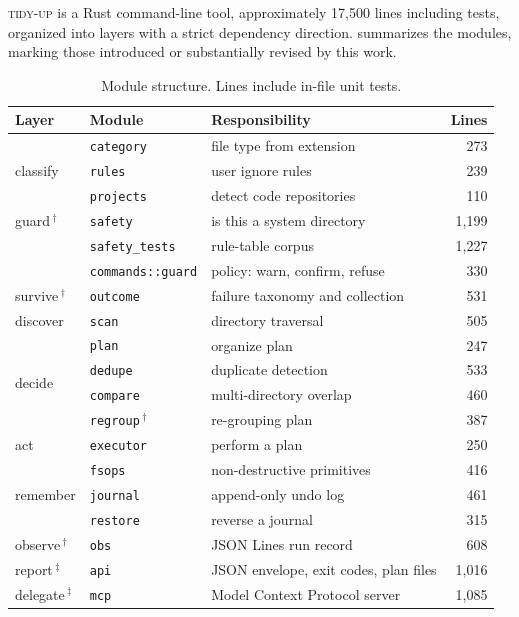 \documentclass[11pt,a4paper]{article}
\newcommand{\code}[1]{\texttt{\small #1}}
\newcommand{\tool}{\textsc{tidy-up}}
\begin{document}
\tool{} is a Rust command-line tool, approximately 17{,}500 lines including tests,
organized into layers with a strict dependency direction. 
summarizes the modules, marking those introduced or substantially revised by this
work.

\begin{table}[t]
\centering
\small
\caption{Module structure. Lines include in-file unit tests.}
\label{tab:modules}
\begin{tabularx}{\textwidth}{@{}l l X r@{}}
\toprule
\textbf{Layer} & \textbf{Module} & \textbf{Responsibility} & \textbf{Lines} \\
\midrule
\multirow{3}{*}{classify} & \code{category} & file type from extension & 273 \\
 & \code{rules} & user ignore rules & 239 \\
 & \code{projects} & detect code repositories & 110 \\
\midrule
guard\,$^\dagger$ & \code{safety} & is this a system directory & 1{,}199 \\
 & \code{safety\_tests} & rule-table corpus & 1{,}227 \\
 & \code{commands::guard} & policy: warn, confirm, refuse & 330 \\
\midrule
survive\,$^\dagger$ & \code{outcome} & failure taxonomy and collection & 531 \\
\midrule
discover & \code{scan} & directory traversal & 505 \\
\midrule
\multirow{4}{*}{decide} & \code{plan} & organize plan & 247 \\
 & \code{dedupe} & duplicate detection & 533 \\
 & \code{compare} & multi-directory overlap & 460 \\
 & \code{regroup}\,$^\dagger$ & re-grouping plan & 387 \\
\midrule
act & \code{executor} & perform a plan & 250 \\
 & \code{fsops} & non-destructive primitives & 416 \\
\midrule
remember & \code{journal} & append-only undo log & 461 \\
 & \code{restore} & reverse a journal & 315 \\
\midrule
observe\,$^\dagger$ & \code{obs} & JSON Lines run record & 608 \\
\midrule
report\,$^\ddagger$ & \code{api} & JSON envelope, exit codes, plan files & 1{,}016 \\
\midrule
delegate\,$^\ddagger$ & \code{mcp} & Model Context Protocol server & 1{,}085 \\

\end{tabularx}
\end{table}
\end{document}
